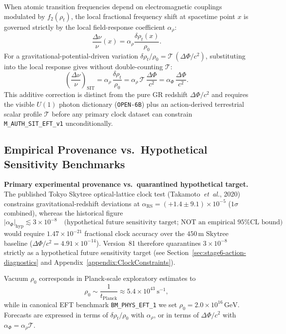 When atomic transition frequencies depend on electromagnetic couplings modulated by \(f_2(\rho_t)\), the local fractional frequency shift at spacetime point \(x\) is governed strictly by the local field-response coefficient \(\alpha_\rho\):
\[
\frac{\Delta \nu}{\nu}(x) = \alpha_\rho \frac{\delta \rho_t(x)}{\rho_0}.
\]
For a gravitational-potential-driven variation \(\delta\rho_t/\rho_0 = \mathcal{T}\,(\Delta\Phi/c^2)\), substituting into the local response gives without double-counting \(\mathcal{T}\):
\[
\left(\frac{\Delta \nu}{\nu}\right)_{\mathrm{SIT}}
= \alpha_\rho\,\frac{\delta \rho_t}{\rho_0}
= \alpha_\rho\,\mathcal{T}\,\frac{\Delta\Phi}{c^2}
= \alpha_\Phi\,\frac{\Delta\Phi}{c^2}.
\]
This additive correction is distinct from the pure GR redshift \(\Delta\Phi/c^2\) and requires the visible \(U(1)\) photon dictionary (\texttt{OPEN-6B}) plus an action-derived terrestrial scalar profile \(\mathcal{T}\) before any primary clock dataset can constrain \texttt{M\_AUTH\_SIT\_EFT\_v1} unconditionally.

\subsection{Empirical Provenance vs.\ Hypothetical Sensitivity Benchmarks}

\textbf{Primary experimental provenance vs.\ quarantined hypothetical target.} The published Tokyo Skytree optical-lattice clock test (Takamoto~\emph{et~al.}, 2020) constrains gravitational-redshift deviations at \(\alpha_{\mathrm{RS}} = (+1.4 \pm 9.1)\times 10^{-5}\) (\(1\sigma\) combined), whereas the historical figure
\[
|\alpha_\Phi|_{\mathrm{hyp}} \lesssim 3 \times 10^{-8} \quad \text{(hypothetical future sensitivity target; NOT an empirical 95\% CL bound)}
\]
would require \(1.47\times 10^{-21}\) fractional clock accuracy over the \(450\,\mathrm{m}\) Skytree baseline (\(\Delta\Phi/c^2 = 4.91\times 10^{-14}\)). Version~81 therefore quarantines \(3\times 10^{-8}\) strictly as a hypothetical future sensitivity target (see Section~\ref{sec:stage6-action-diagnostics} and Appendix~\ref{appendix:ClockConstraints}).

Vacuum \(\rho_0\) corresponds in Planck-scale exploratory estimates to
\[
\rho_0 \sim \frac{1}{t_{\mathrm{Planck}}} \approx 5.4 \times 10^{43} \ \mathrm{s}^{-1},
\]
while in canonical EFT benchmark \texttt{BM\_PHYS\_EFT\_1} we set \(\rho_0 = 2.0\times 10^{16}\,\mathrm{GeV}\). Forecasts are expressed in terms of \(\delta\rho_t/\rho_0\) with \(\alpha_\rho\), or in terms of \(\Delta\Phi/c^2\) with \(\alpha_\Phi = \alpha_\rho\mathcal{T}\).

